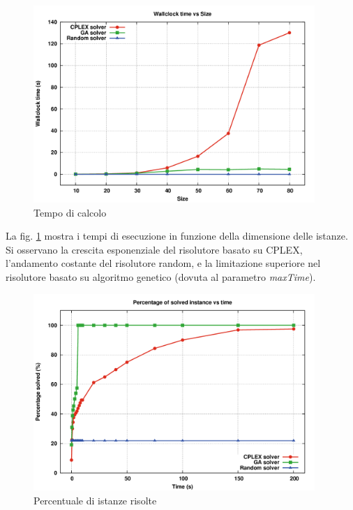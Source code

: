 \documentclass[a4paper, 10pt]{report}
\begin{document}
\begin{figure}
  \centering
  \includegraphics[width=0.95\textwidth]{images/plot-wallclock}
  \caption{Tempo di calcolo}
  \label{fig:plot-wallclock}
\end{figure}

La fig. \ref{fig:plot-wallclock} mostra i tempi di esecuzione in funzione
della dimensione delle istanze. Si osservano la crescita esponenziale
del risolutore basato su CPLEX, l'andamento costante del risolutore
random, e la limitazione superiore nel risolutore basato su algoritmo
genetico (dovuta al parametro \emph{maxTime}).

\begin{figure}
  \centering
  \includegraphics[width=0.95\textwidth]{images/plot-cumulative}
  \caption{Percentuale di istanze risolte}
  \label{fig:plot-cumulative}
\end{figure}
\end{document}
